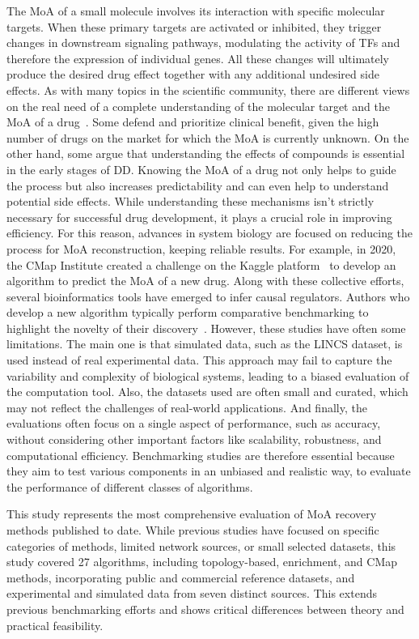 The \gls{MoA} of a small molecule involves its interaction with specific molecular targets. When these primary targets are activated or inhibited, they trigger changes in downstream signaling pathways, modulating the activity of \gls{TF}s and therefore the expression of individual genes. 
All these changes will ultimately produce the desired drug effect together with any additional undesired side effects. 
As with many topics in the scientific community, there are different views on the real need of a complete understanding of the molecular target and the \gls{MoA} of a drug~\cite{RN112}. 
Some defend and prioritize clinical benefit, given the high number of drugs on the market for which the \gls{MoA} is currently unknown. 
On the other hand, some argue that understanding the effects of compounds is essential in the early stages of \gls{DD}. 
Knowing the \gls{MoA} of a drug not only helps to guide the process but also increases predictability and can even help to understand potential side effects. 
While understanding these mechanisms isn't strictly necessary for successful drug development, it plays a crucial role in improving efficiency. 
For this reason, advances in system biology are focused on reducing the process for \gls{MoA} reconstruction, keeping reliable results. 
For example, in 2020, the \gls{CMap} Institute created a challenge on the Kaggle platform~\cite{RN162} to develop an algorithm to predict the \gls{MoA} of a new drug. 
Along with these collective efforts, several bioinformatics tools have emerged to infer causal regulators. 
Authors who develop a new algorithm typically perform comparative benchmarking to highlight the novelty of their discovery~\cite{RN109}. 
However, these studies have often some limitations. The main one is that simulated data, such as the \gls{LINCS} dataset, is used instead of real experimental data. 
This approach may fail to capture the variability and complexity of biological systems, leading to a biased evaluation of the computation tool. Also, the datasets used are often small and curated, which may not reflect the challenges of real-world applications.
And finally, the evaluations often focus on a single aspect of performance, such as accuracy, without considering other important factors like scalability, robustness, and computational efficiency. 
Benchmarking studies are therefore essential because they aim to test various components in an unbiased and realistic way, to evaluate the performance of different classes of algorithms. 

This study represents the most comprehensive evaluation of \gls{MoA} recovery methods published to date. 
While previous studies have focused on specific categories of methods, limited network sources, or small selected datasets, this study covered 27 algorithms, including topology-based, enrichment, and \gls{CMap} methods, incorporating public and commercial reference datasets, and experimental and simulated data from seven distinct sources. 
This extends previous benchmarking efforts and shows critical differences between theory and practical feasibility.

